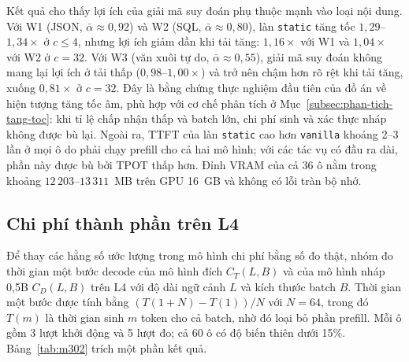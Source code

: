 Kết quả cho thấy lợi ích của giải mã suy đoán phụ thuộc mạnh vào loại nội dung. Với W1 (JSON, $\bar\alpha \approx 0{,}92$) và W2 (SQL, $\bar\alpha \approx 0{,}80$), làn \texttt{static} tăng tốc $1{,}29$--$1{,}34\times$ ở $c \le 4$, nhưng lợi ích giảm dần khi tải tăng: $1{,}16\times$ với W1 và $1{,}04\times$ với W2 ở $c=32$. Với W3 (văn xuôi tự do, $\bar\alpha \approx 0{,}55$), giải mã suy đoán không mang lại lợi ích ở tải thấp ($0{,}98$--$1{,}00\times$) và trở nên chậm hơn rõ rệt khi tải tăng, xuống $0{,}81\times$ ở $c = 32$. Đây là bằng chứng thực nghiệm đầu tiên của đồ án về hiện tượng tăng tốc âm, phù hợp với cơ chế phân tích ở Mục~\ref{subsec:phan-tich-tang-toc}: khi tỉ lệ chấp nhận thấp và batch lớn, chi phí sinh và xác thực nháp không được bù lại. Ngoài ra, TTFT của làn \texttt{static} cao hơn \texttt{vanilla} khoảng 2--3 lần ở mọi ô do phải chạy prefill cho cả hai mô hình; với các tác vụ có đầu ra dài, phần này được bù bởi TPOT thấp hơn. Đỉnh VRAM của cả 36 ô nằm trong khoảng $12\,203$--$13\,311$~MB trên GPU 16~GB và không có lỗi tràn bộ nhớ.

\subsection{Chi phí thành phần trên L4}
\label{subsec:kq-m302}

Để thay các hằng số ước lượng trong mô hình chi phí bằng số đo thật, nhóm đo thời gian một bước decode của mô hình đích $C_T(L, B)$ và của mô hình nháp 0,5B $C_D(L, B)$ trên L4 với độ dài ngữ cảnh $L$ và kích thước batch $B$. Thời gian một bước được tính bằng $(T(1+N) - T(1))/N$ với $N = 64$, trong đó $T(m)$ là thời gian sinh $m$ token cho cả batch, nhờ đó loại bỏ phần prefill. Mỗi ô gồm 3 lượt khởi động và 5 lượt đo; cả 60 ô có độ biến thiên dưới 15\%. Bảng~\ref{tab:m302} trích một phần kết quả.


